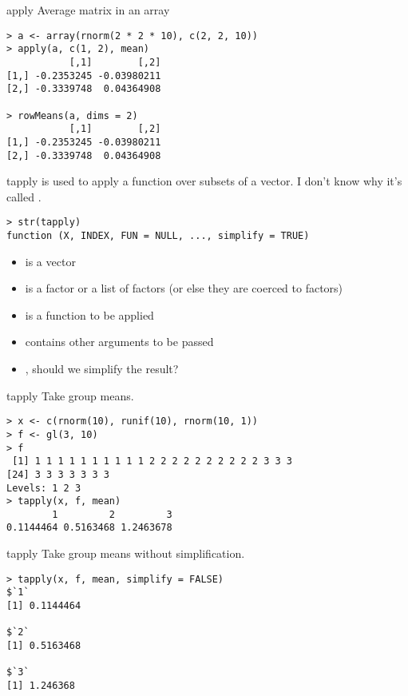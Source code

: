 \documentclass[aspectratio=169]{beamer}
\begin{document}
\begin{frame}[fragile]{apply}
Average matrix in an array
\begin{verbatim}
> a <- array(rnorm(2 * 2 * 10), c(2, 2, 10))
> apply(a, c(1, 2), mean)
           [,1]        [,2]
[1,] -0.2353245 -0.03980211
[2,] -0.3339748  0.04364908

> rowMeans(a, dims = 2)
           [,1]        [,2]
[1,] -0.2353245 -0.03980211
[2,] -0.3339748  0.04364908
\end{verbatim}
\end{frame}

\begin{frame}[fragile]{tapply}
 is used to apply a function over subsets of a vector.  I
don't know why it's called .
\begin{verbatim}
> str(tapply)
function (X, INDEX, FUN = NULL, ..., simplify = TRUE)  
\end{verbatim}
\begin{itemize}
\item
{} is a vector
\item
{} is a factor or a list of factors (or else they are coerced to
factors)
\item
{} is a function to be applied
\item
{} contains other arguments to be passed 
\item
{}, should we simplify the result?
\end{itemize}
\end{frame}

\begin{frame}[fragile]{tapply}
Take group means.
\begin{verbatim}
> x <- c(rnorm(10), runif(10), rnorm(10, 1))
> f <- gl(3, 10)
> f
 [1] 1 1 1 1 1 1 1 1 1 1 2 2 2 2 2 2 2 2 2 2 3 3 3
[24] 3 3 3 3 3 3 3
Levels: 1 2 3
> tapply(x, f, mean)
        1         2         3 
0.1144464 0.5163468 1.2463678 
\end{verbatim}
\end{frame}

\begin{frame}[fragile]{tapply}
Take group means without simplification.
\begin{verbatim}
> tapply(x, f, mean, simplify = FALSE)
$`1`
[1] 0.1144464

$`2`
[1] 0.5163468

$`3`
[1] 1.246368
\end{verbatim}
\end{frame}
\end{document}

